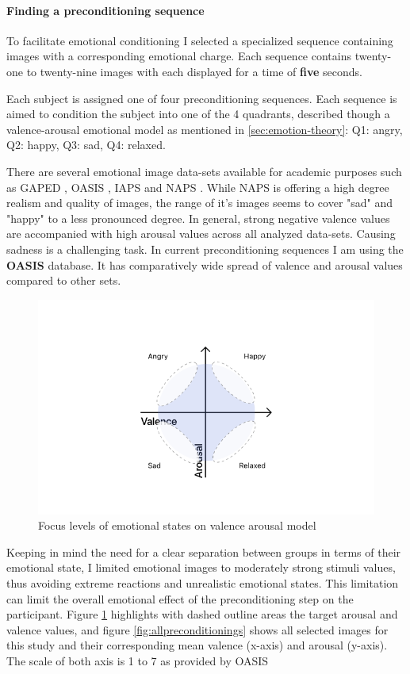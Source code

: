 \paragraph{Finding a preconditioning sequence}
To facilitate emotional conditioning I selected a specialized sequence containing images with a corresponding emotional charge.
Each sequence contains twenty-one to twenty-nine images with each displayed for a time of \textbf{five} seconds.

Each subject is assigned one of four preconditioning sequences. Each sequence is aimed to condition the subject into one of the 4 quadrants, described though a valence-arousal emotional model as mentioned in \ref{sec:emotion-theory}: Q1: angry, Q2: happy, Q3: sad, Q4: relaxed.

There are several emotional image data-sets available for academic purposes such as GAPED \cite{Dan-Glauser2011}, OASIS \cite{Kurdi2017}, IAPS \cite{Lang1997} and NAPS \cite{Marchewka2014}. While NAPS is offering a high degree realism and quality of images, the range of it's images seems to cover "sad" and "happy" to a less pronounced degree. In general, strong negative valence values are accompanied with high arousal values across all analyzed data-sets. Causing sadness is a challenging task. In current preconditioning sequences I am using the \textbf{OASIS} database. It has comparatively wide spread of valence and arousal values compared to other sets.

\begin{figure}
	\centering
	\includegraphics[width=0.7\linewidth]{graphics/Valence-Arousal-Model-1.png}
	\caption{Focus levels of emotional states on valence arousal model}
	\label{fig:valence-arousal-model-2}
\end{figure}

Keeping in mind the need for a clear separation between groups in terms of their emotional state, I limited emotional images to moderately strong stimuli values, thus avoiding extreme reactions and unrealistic emotional states. This limitation can limit the overall emotional effect of the preconditioning step on the participant. Figure \ref{fig:valence-arousal-model-2} highlights with dashed outline areas the target arousal and valence values, and figure \ref{fig:allpreconditionings} shows all selected images for this study and their corresponding mean valence (x-axis) and arousal (y-axis). The scale of both axis is 1 to 7 as provided by OASIS \cite{Kurdi2017}

